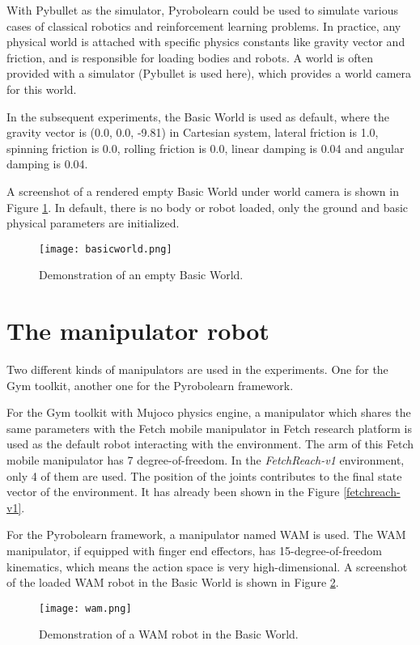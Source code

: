 \documentclass[a4paper, 12pt]{report}
\begin{document}
    With Pybullet as the simulator, Pyrobolearn could be used to simulate various cases of classical robotics and reinforcement learning problems. In practice, any physical world is attached with specific physics constants like gravity vector and friction, and is responsible for loading bodies and robots. A world is often provided with a simulator (Pybullet is used here), which provides a world camera for this world.

    In the subsequent experiments, the Basic World is used as default, where the gravity vector is (0.0, 0.0, -9.81) in Cartesian system, lateral friction is 1.0, spinning friction is 0.0, rolling friction is 0.0, linear damping is 0.04 and angular damping is 0.04.

    A screenshot of a rendered empty Basic World under world camera is shown in Figure \ref{basicworld}. In default, there is no body or robot loaded, only the ground and basic physical parameters are initialized.

    \begin{figure}
        \centering
        \texttt{[image: basicworld.png]}
        \caption{Demonstration of an empty Basic World. }
        \label{basicworld}
    \end{figure}

    \section {The manipulator robot}

    Two different kinds of manipulators are used in the experiments. One for the Gym toolkit, another one for the Pyrobolearn framework.

    For the Gym toolkit with Mujoco physics engine, a manipulator which shares the same parameters with the Fetch mobile manipulator in Fetch research platform is used as the default robot interacting with the environment\cite{Wise2016FetchF}. The arm of this Fetch mobile manipulator has 7 degree-of-freedom. In the \emph{FetchReach-v1} environment, only 4 of them are used. The position of the joints contributes to the final state vector of the environment. It has already been shown in the Figure \ref{fetchreach-v1}.

    For the Pyrobolearn framework, a manipulator named WAM is used. The WAM manipulator, if equipped with finger end effectors, has 15-degree-of-freedom kinematics, which means the action space is very high-dimensional. A screenshot of the loaded WAM robot in the Basic World is shown in Figure \ref{wam}.
    \begin{figure}
        \centering
        \texttt{[image: wam.png]}
        \caption{Demonstration of a WAM robot in the Basic World. }
        \label{wam}
    \end{figure}
    
\end{document}
